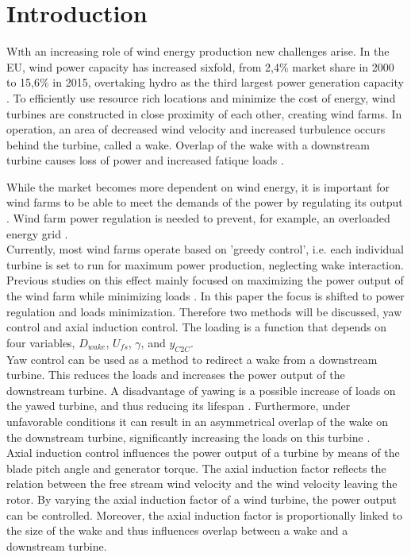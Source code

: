\section{Introduction}
\lettrine[nindent=0em,lines=3]
With an increasing role of wind energy production new challenges arise\cite{Nat2016}. In the EU, wind power capacity has increased sixfold, from 2,4\% market share in 2000 to 15,6\% in 2015, overtaking hydro as the third largest power generation capacity \cite{EWEA2016}. To efficiently use resource rich locations and minimize the cost of energy, wind turbines are constructed in close proximity of each other, creating wind farms. In operation, an area of decreased wind velocity and increased turbulence occurs behind the turbine, called a wake. Overlap of the wake with a downstream turbine causes loss of power and increased fatique loads \cite{Boersma2017, Wilson2017, Dijk2016, Fleming2014, Zalkind2016}. 

While the market becomes more dependent on wind energy, it is important for wind farms to be able to meet the demands of the power by regulating its output \cite{Tande2003}. Wind farm power regulation is needed to prevent, for example, an overloaded energy grid \cite{Hansen2014}.  \\
\indent Currently, most wind farms operate based on 'greedy control', i.e. each individual turbine is set to run for maximum power production, neglecting wake interaction. Previous studies on this effect mainly focused on maximizing the power output of the wind farm while minimizing loads \cite{Wilson2017, Dijk2016, vanDijk2016}. In this paper the focus is shifted to power regulation and loads minimization. Therefore two methods will be discussed, yaw control and axial induction control. The loading is a function that depends on four variables, $D_{wake}$, $U_{fs}$, $\gamma$, and $y _{C2C}$. \\
\indent Yaw control can be used as a method to redirect a wake from a downstream turbine. This reduces the loads and increases the power output of the downstream turbine. A disadvantage of yawing is a possible increase of loads on the yawed turbine, and thus reducing its lifespan \cite{Zalkind2016,Kanev2017}. Furthermore, under unfavorable conditions it can result in an asymmetrical overlap of the wake on the downstream turbine, significantly increasing the loads on this turbine \cite{Wilson2017,Dijk2016}. \\
\indent Axial induction control influences the power output of a turbine by means of the blade pitch angle and generator torque. The axial induction factor reflects the relation between the free stream wind velocity and the wind velocity leaving the rotor. By varying the axial induction factor of a wind turbine, the power output can be controlled. Moreover, the axial induction factor is proportionally linked to the size of the wake and thus influences overlap between a wake and a downstream turbine.  

